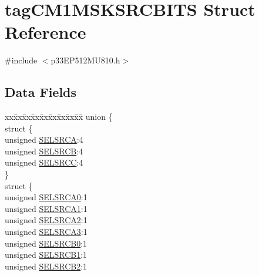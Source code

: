\hypertarget{structtag_c_m1_m_s_k_s_r_c_b_i_t_s}{}\section{tag\+C\+M1\+M\+S\+K\+S\+R\+C\+B\+I\+TS Struct Reference}
\label{structtag_c_m1_m_s_k_s_r_c_b_i_t_s}


{\ttfamily \#include $<$p33\+E\+P512\+M\+U810.\+h$>$}

\subsection*{Data Fields}
\begin{DoxyCompactItemize}
\item 
\begin{tabbing}
xx\=xx\=xx\=xx\=xx\=xx\=xx\=xx\=xx\=\kill
union \{\\
\>struct \{\\
\>\>unsigned \hyperlink{structtag_c_m1_m_s_k_s_r_c_b_i_t_s_a71efbbcc07c5589abbdc8fbc64bb43b7}{SELSRCA}:4\\
\>\>unsigned \hyperlink{structtag_c_m1_m_s_k_s_r_c_b_i_t_s_a732414962412dfa9aa0a35c8acdf7441}{SELSRCB}:4\\
\>\>unsigned \hyperlink{structtag_c_m1_m_s_k_s_r_c_b_i_t_s_adb722d9a00c9d716af69dbadf03f066b}{SELSRCC}:4\\
\>\} \\
\>struct \{\\
\>\>unsigned \hyperlink{structtag_c_m1_m_s_k_s_r_c_b_i_t_s_a4f44ef494908be7240123901bbcd0235}{SELSRCA0}:1\\
\>\>unsigned \hyperlink{structtag_c_m1_m_s_k_s_r_c_b_i_t_s_aa42e5e64574e7f78278952e37052babd}{SELSRCA1}:1\\
\>\>unsigned \hyperlink{structtag_c_m1_m_s_k_s_r_c_b_i_t_s_a8e046d28e2f14c607d33a0126ad11f85}{SELSRCA2}:1\\
\>\>unsigned \hyperlink{structtag_c_m1_m_s_k_s_r_c_b_i_t_s_aa6a1c05a91e9d2a1114d06b8effb0eaf}{SELSRCA3}:1\\
\>\>unsigned \hyperlink{structtag_c_m1_m_s_k_s_r_c_b_i_t_s_a5c1da19a6275a00280765b4def3ea9a9}{SELSRCB0}:1\\
\>\>unsigned \hyperlink{structtag_c_m1_m_s_k_s_r_c_b_i_t_s_a99130b1cce6df5fb6cc53450953c64f5}{SELSRCB1}:1\\
\>\>unsigned \hyperlink{structtag_c_m1_m_s_k_s_r_c_b_i_t_s_a8b560e65c1713248c6b69d161849b4b4}{SELSRCB2}:1\\

\end{tabbing}
\end{DoxyCompactItemize}
